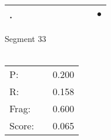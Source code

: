 \documentclass[landscape]{article}
\newcommand{\ssp}{\hspace{2pt}}
\newcommand{\mex}{\cellcolor{g}$\bullet$}
\begin{document}
\begin{tabular}{|l|p{10pt}|p{10pt}|p{10pt}|p{10pt}|p{10pt}|p{10pt}|p{10pt}|p{10pt}|p{10pt}|}
\hline
\ssp \cellcolor{ref8}. \ssp&\hspace{2pt}&\hspace{2pt}&\hspace{2pt}&\hspace{2pt}&\hspace{2pt}&\hspace{2pt}&\hspace{2pt}&\hspace{2pt}&\hspace{2pt}\mex\\
\hline
\end{tabular}

\vspace{6pt}
\noindent Segment 33\\\\
\noindent\begin{tabular}{lm{12pt}r}
\hline
P:&&0.200\\
R:&&0.158\\
Frag:&&0.600\\
Score:&&0.065\\
\end{tabular}

\newpage
\end{document}

